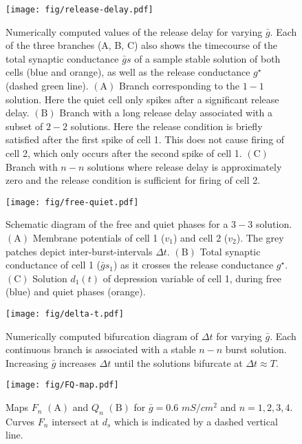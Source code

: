 \documentclass[utf8, draft]{frontiersFPHY} %
\newcommand{\gbar}{\bar g}
\newcommand{\delt}{\Delta t}
\begin{document}
\begin{figure}[h!]
  \centering
  \texttt{[image: fig/release-delay.pdf]}
  \caption{Numerically computed values of the release delay for varying $\gbar$. Each of
    the three branches (A, B, C) also shows the timecourse of the total synaptic
    conductance $\gbar s$ of a sample stable solution of both cells (blue and orange),
    as well as the release conductance $g^{\star}$ (dashed green line).
    $\bm{\mathrm{(A)}}$ Branch corresponding to the $1-1$ solution. Here the quiet
    cell only spikes after a significant release delay. $\bm{\mathrm{(B)}}$ Branch with
    a long release delay associated with a subset of $2-2$ solutions. Here the release
    condition is briefly satisfied after the first spike of cell 1. This does not cause
    firing of cell 2, which only occurs after the second spike of cell 1.
    $\bm{\mathrm{(C)}}$ Branch with $n-n$ solutions  where release delay is
    approximately zero and the release condition is sufficient for firing of cell 2.
    ~\label{fig:release-delay}}
\end{figure}

\begin{figure}[h!]
  \centering
  \texttt{[image: fig/free-quiet.pdf]}
  \caption{Schematic diagram of the free and quiet phases for a $3-3$ solution.
    $\bm{\mathrm{(A)}}$ Membrane potentials of cell 1 ($v_{1}$) and cell 2 ($v_{2}$).
    The grey patches depict inter-burst-intervals $\delt$. $\bm{\mathrm{(B)}}$ Total
    synaptic conductance of cell 1 ($\gbar s_1$) as it crosses the release conductance
    $g^{\star}$. $\bm{\mathrm{(C)}}$ Solution $d_1(t)$ of depression variable of cell
    1, during free (blue) and quiet phases (orange).~\label{fig:free-quiet1}}
\end{figure}

\begin{figure}[h!]
  \centering
  \texttt{[image: fig/delta-t.pdf]}
  \caption{Numerically computed bifurcation diagram of $\delt$ for varying $\gbar$.
    Each continuous branch is associated with a stable $n-n$ burst solution. Increasing
    $\gbar$ increases $\Delta t$ until the solutions bifurcate at $\Delta t\approx
    T$.~\label{fig:delta-t}}
\end{figure}

\begin{figure}[h!]
  \centering
  \texttt{[image: fig/FQ-map.pdf]}
  \caption{Maps $F_n$ $\bm{\mathrm{(A)}}$ and $Q_n$ $\bm{\mathrm{(B)}}$ for
  $\gbar=0.6$ $\si{mS/cm^{2}}$ and $n=1,2,3,4$. Curves $F_n$ intersect at
  $d_{s}$ which is indicated by a dashed vertical line.~\label{fig:FQ-map}}
\end{figure}
\end{document}
